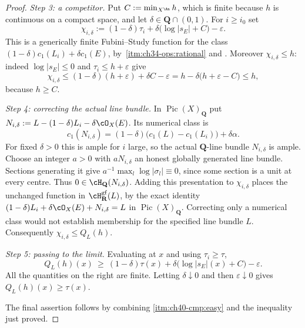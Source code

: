 \begin{proof}
\emph{Step 3: a competitor.}  Put $C:=\min_{X^{\An}}h$, which is finite
because $h$ is continuous on a compact space, and let
$\delta\in\mathbf Q\cap(0,1)$.  For $i\ge i_0$ set
\[
 \chi_{i,\delta}
 :=(1-\delta)\tau_i+\delta\bigl(\log|s_E|+C\bigr)-\varepsilon .
\]
This is a generically finite Fubini--Study function for the class
$(1-\delta)c_1(L_i)+\delta c_1(E)$, by
\,\cref{itm:ch34-ops:rational} and
.  Moreover $\chi_{i,\delta}\le h$: indeed
$\log|s_E|\le0$ and $\tau_i\le h+\varepsilon$ give
\[
 \chi_{i,\delta}\le(1-\delta)(h+\varepsilon)+\delta C-\varepsilon
 = h-\delta\bigl(h+\varepsilon-C\bigr)\le h,
\]
because $h\ge C$.

\emph{Step 4: correcting the actual line bundle.}  In $\operatorname{Pic}(X)_{\mathbf Q}$ put
$N_{i,\delta}:=L-(1-\delta)L_i-\delta\cO_X(E)$.  Its numerical class is
\[
 c_1(N_{i,\delta})
 =(1-\delta)\bigl(c_1(L)-c_1(L_i)\bigr)+\delta\alpha .
\]
For fixed $\delta>0$ this is ample for $i$ large, so the actual
$\mathbf Q$-line bundle $N_{i,\delta}$ is ample.  Choose an integer
$a>0$ with $aN_{i,\delta}$ an honest globally generated line bundle.
Sections generating it give $a^{-1}\max_l\log|\sigma_l|\equiv0$,
since some section is a unit at every centre.  Thus
$0\in\cH_{\mathbf Q}(N_{i,\delta})$.  Adding this presentation to
$\chi_{i,\delta}$ places the unchanged function in
$\cH^{\mathrm{gf}}_{\mathbf R}(L)$, by the exact identity
$(1-\delta)L_i+\delta\cO_X(E)+N_{i,\delta}=L$ in $\operatorname{Pic}(X)_{\mathbf Q}$.
Correcting only a numerical class would not establish membership for
the specified line bundle $L$.  Consequently $\chi_{i,\delta}\le Q_L(h)$.

\emph{Step 5: passing to the limit.}  Evaluating at $x$ and using
$\tau_i\ge\tau$,
\[
 Q_L(h)(x)\ \ge\ (1-\delta)\tau(x)
   +\delta\bigl(\log|s_E|(x)+C\bigr)-\varepsilon .
\]
All the quantities on the right are finite.  Letting $\delta\downarrow0$
and then $\varepsilon\downarrow0$ gives $Q_L(h)(x)\ge\tau(x)$.

The final assertion follows by combining \cref{itm:ch40-cmp:easy} and the
inequality just proved.
\end{proof}


